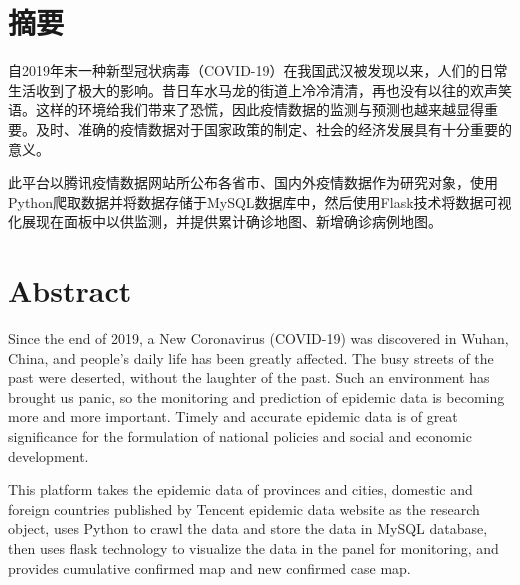 \maketitle%
\MAKETITLE%
\intobmk\chapter*{摘\quad 要}%
\setcounter{page}{1}%

自2019年末一种新型冠状病毒（COVID-19）在我国武汉被发现以来，人们的日常生活收到了极大的影响。昔日车水马龙的街道上冷冷清清，再也没有以往的欢声笑语。这样的环境给我们带来了恐慌，因此疫情数据的监测与预测也越来越显得重要。及时、准确的疫情数据对于国家政策的制定、社会的经济发展具有十分重要的意义。

此平台以腾讯疫情数据网站所公布各省市、国内外疫情数据作为研究对象，使用Python爬取数据并将数据存储于MySQL数据库中，然后使用Flask技术将数据可视化展现在面板中以供监测，并提供累计确诊地图、新增确诊病例地图。

\intobmk\chapter*{Abstract}%

Since the end of 2019, a New Coronavirus (COVID-19) was discovered in Wuhan, China, and people's daily life has been greatly affected. The busy streets of the past were deserted, without the laughter of the past. Such an environment has brought us panic, so the monitoring and prediction of epidemic data is becoming more and more important. Timely and accurate epidemic data is of great significance for the formulation of national policies and social and economic development.

This platform takes the epidemic data of provinces and cities, domestic and foreign countries published by Tencent epidemic data website as the research object, uses Python to crawl the data and store the data in MySQL database, then uses flask technology to visualize the data in the panel for monitoring, and provides cumulative confirmed map and new confirmed case map.

